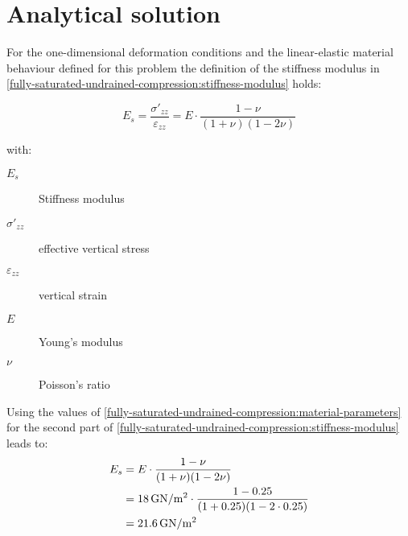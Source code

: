 \section{Analytical solution}

For the one-dimensional deformation conditions and the linear-elastic material
behaviour defined for this problem the definition of the stiffness modulus in
\autoref{fully-saturated-undrained-compression:stiffness-modulus} holds:

\begin{equation}
    \label{fully-saturated-undrained-compression:stiffness-modulus}
    E_s = \frac{\sigma'_{zz}}{\varepsilon_{zz}} = E \cdot \frac{1 - \nu}{(1 + \nu)(1 - 2 \nu)}
\end{equation}

\begin{samepage}
    with:
    \begin{description}
        \item[$E_s$] Stiffness modulus
        \item[$\sigma'_{zz}$] effective vertical stress
        \item[$\varepsilon_{zz}$] vertical strain
        \item[$E$] Young's modulus
        \item[$\nu$] Poisson's ratio
    \end{description}
\end{samepage}

Using the values of
\autoref{fully-saturated-undrained-compression:material-parameters} for the
second part of
\autoref{fully-saturated-undrained-compression:stiffness-modulus} leads to:
\begin{equation}
    \label{fully-saturated-undrained-compression:stiffness-modulus-value}
    \begin{split}
        E_s & = E \cdot \frac{1 - \nu}{(1 + \nu)(1 - 2 \nu)}                                                                       \\
            & = \SI{18}{\si[per-mode = symbol]{\giga\newton\per\square\metre}} \cdot \frac{1 - 0.25}{(1 + 0.25)(1 - 2 \cdot 0.25)} \\
            & = \SI{21.6}{\si[per-mode = symbol]{\giga\newton\per\square\metre}}
    \end{split}
\end{equation}

